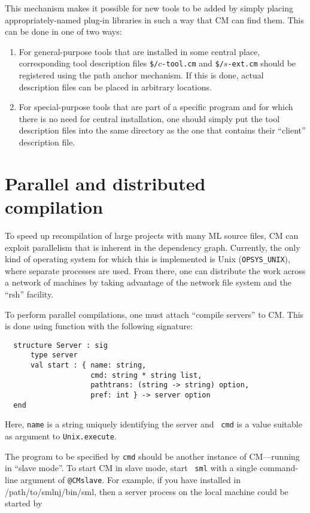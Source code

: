 \documentclass[titlepage,letterpaper]{article}
\begin{document}
This mechanism makes it possible for new tools to be added by simply
placing appropriately-named plug-in libraries in such a way that CM
can find them.  This can be done in one of two ways:

\begin{enumerate}
\item For general-purpose tools that are installed in some central
place, corresponding tool description files {\tt \$/}$c${\tt -tool.cm}
and {\tt \$/}$s${\tt -ext.cm} should be registered using the path
anchor mechanism.  If this is done, actual description files can be
placed in arbitrary locations.
\item For special-purpose tools that are part of a specific program
and for which there is no need for central installation, one should
simply put the tool description files into the same directory as the
one that contains their ``client'' description file.
\end{enumerate}

\section{Parallel and distributed compilation}
\label{sec:parmake}

To speed up recompilation of large projects with many ML source files,
CM can exploit parallelism that is inherent in the dependency graph.
Currently, the only kind of operating system for which this is
implemented is Unix ({\tt OPSYS\_UNIX}), where separate processes are
used.  From there, one can distribute the work across a network of
machines by taking advantage of the network file system and the
``rsh'' facility.

To perform parallel compilations, one must attach ``compile servers''
to CM.  This is done using function
with the following signature:

\begin{verbatim}
  structure Server : sig
      type server
      val start : { name: string,
                    cmd: string * string list,
                    pathtrans: (string -> string) option,
                    pref: int } -> server option
  end
\end{verbatim}

Here, {\tt name} is a string uniquely identifying the server and {\tt
cmd} is a value suitable as argument to {\tt Unix.execute}.

The program to be specified by {\tt cmd} should be another instance of
CM---running in ``slave mode''.  To start CM in slave mode, start {\tt
sml} with a single command-line argument of {\tt @CMslave}.  For
example, if you have installed in /path/to/smlnj/bin/sml, then a
server process on the local machine could be started by
\end{document}
